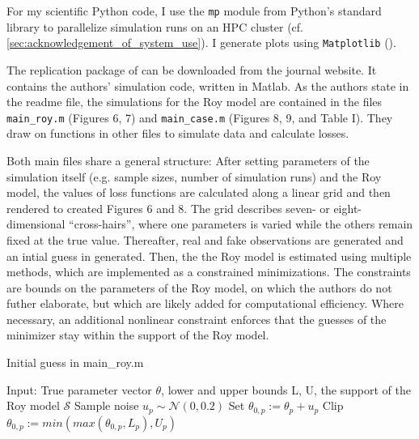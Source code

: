 For my scientific Python code, I use the \texttt{mp} module from Python's standard library to parallelize simulation runs on an HPC cluster (cf. \ref{sec:acknowledgement_of_system_use}).
I generate plots using \texttt{Matplotlib} (\cite{Matplotlib}).

The replication package of \cite{kaji2023adversarial} can be downloaded from the journal website.
It contains the authors' simulation code, written in Matlab. %
As the authors state in the readme file, the simulations for the Roy model are contained in the files \texttt{main\_roy.m} (Figures 6, 7) and \texttt{main\_case.m} (Figures 8, 9, and Table I).
They draw on functions in other files to simulate data and calculate losses.

Both main files share a general structure:
After setting parameters of the simulation itself (e.g. sample sizes, number of simulation runs) and the Roy model, the values of loss functions are calculated along a linear grid and then rendered to created Figures 6 and 8.
The grid describes seven- or eight-dimensional ``cross-hairs'', where one parameters is varied while the others remain fixed at the true value.
Thereafter, real and fake observations are generated and an intial guess in generated.
Then, the the Roy model is estimated using multiple methods, which are implemented as a constrained minimizations.%
The constraints are bounds on the parameters of the Roy model, on which the authors do not futher elaborate, but which are likely added for computational efficiency. %
Where necessary, an additional nonlinear constraint enforces that the guesses of the minimizer stay within the support of the Roy model.

\begin{algorithm}
    \caption{Initial guess in main\_roy.m}
    \label{alg:theta0}
    \begin{algorithmic}
        \STATE Input: True parameter vector $\theta$, lower and upper bounds L, U, the support of the Roy model $\mathcal{S}$
            \STATE Sample noise $u_p \sim \mathcal{N}(0, 0.2)$
            \STATE Set $\theta_{0,p} := \theta_p + u_p$
            \STATE Clip $\theta_{0,p} := min(max(\theta_{0,p}, L_p), U_p)$
        \ENDWHILE
    \end{algorithmic}
\end{algorithm}

